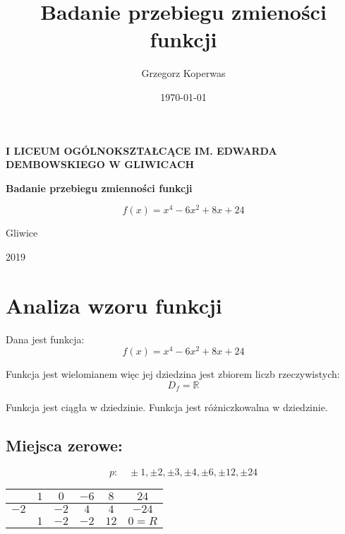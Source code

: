\documentclass[a4paper,12pt]{article}
\title{Badanie przebiegu zmieności funkcji}
\author{Grzegorz Koperwas}
\date{\today}
\begin{document}
\begin{titlepage}
	\begin{center}
		\Large{\textbf{I LICEUM OGÓLNOKSZTAŁCĄCE IM. EDWARDA DEMBOWSKIEGO W GLIWICACH}}

		\vspace{3cm}

		\theauthor

		\vspace{2.5cm}

		\textbf{Badanie przebiegu zmienności funkcji}

		\[f \left( x \right) = x^4 - 6x^2 + 8x + 24 \]

		\vfill

		Gliwice
		\vspace{0.5cm}

		\titlerule
		\vspace{0.6cm}

		2019

	\end{center}

\end{titlepage}

\section{Analiza wzoru funkcji}

Dana jest funkcja:
\[ f \left( x \right) = x^4  - 6x^2 + 8x + 24 \]

Funkcja jest wielomianem więc jej dziedzina jest zbiorem liczb rzeczywistych:
\[D_f = \mathbb{R} \]

Funkcja jest ciągła w dziedzinie. Funkcja jest różniczkowalna w dziedzinie. 
\subsection{Miejsca zerowe:}
\[ p: \quad \pm 1, \pm 2, \pm 3, \pm 4, \pm 6, \pm 12, \pm 24\]

\begin{center}
	
\begin{tabular}{l|c|c|c|c|c}
                           & $1$ & $0$  & $-6$ & $8$  & $24$    \\ \hline

		$-2$ &     & $-2$ & $4$  & $4$  & $-24$   \\ \hline

                           & $1$ & $-2$ & $-2$ & $12$ & $0 = R$ \\  

\end{tabular}
\end{center}
\end{document}
